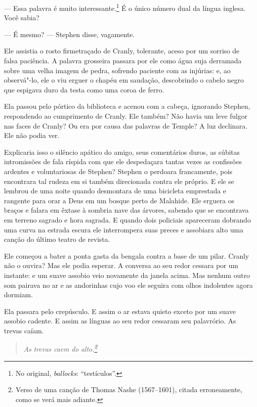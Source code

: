 --- Essa palavra é muito interessante.\footnote{ No original, \textit{ballocks}: ``testículos''.} 
É o único número dual da língua inglesa. Você sabia?

 --- É mesmo? --- Stephen disse, vagamente.

Ele assistia o rosto firmetraçado de Cranly, tolerante, aceso por um  
sorriso de falsa paciência. A palavra grosseira passara por ele como
água suja derramada sobre uma velha imagem de pedra, sofrendo paciente 
com as injúrias: e, ao observá"-lo, ele o viu erguer o chapéu em saudação,
descobrindo o cabelo negro que espigava duro da testa como uma coroa de
ferro.

Ela passou pelo pórtico da biblioteca e acenou com a cabeça, ignorando
Stephen, respondendo ao cumprimento de Cranly. Ele também? Não havia um
leve fulgor nas faces de Cranly? Ou era por causa das palavras de
Temple? A luz declinara. Ele não podia ver.

Explicaria isso o silêncio apático do amigo, seus comentários duros, as
súbitas intromissões de fala ríspida com que ele despedaçara tantas
vezes as confissões ardentes e voluntariosas de Stephen? Stephen o
perdoara francamente, pois encontrara tal rudeza em si também
direcionada contra ele próprio. E ele se lembrou de uma noite quando
desmontara de uma bicicleta emprestada e rangente para orar a Deus em
um bosque perto de Malahide. Ele erguera os braços e falara em êxtase à
sombria nave das árvores, sabendo que se encontrava em terreno sagrado
e hora sagrada. E quando dois policiais apareceram dobrando uma curva na
estrada escura ele interrompera suas preces e assobiara alto uma canção
do último teatro de revista.

Ele começou a bater a ponta gasta da bengala contra a base de um pilar.
Cranly não o ouvira? Mas ele podia esperar. A conversa ao seu redor
cessara por um instante: e um suave assobio veio novamente da janela
acima. Mas nenhum outro som pairava no ar e as andorinhas cujo voo ele
seguira com olhos indolentes agora dormiam.

Ela passara pelo crepúsculo. E assim o ar estava quieto exceto por um
suave assobio cadente. E assim as línguas ao seu redor cessaram seu
palavrório. As trevas caíam.

\begin{verse}\itshape
As trevas caem do alto.\footnote{ Verso de uma canção de Thomas Nashe 
(1567--1601), citada erroneamente, como se verá mais adiante.}
\end{verse}

